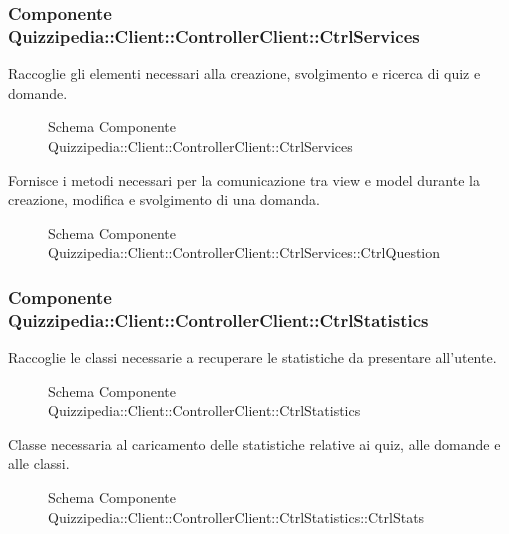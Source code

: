 \subsubsection{Componente Quizzipedia::Client::ControllerClient::CtrlServices}
Raccoglie gli elementi necessari alla creazione, svolgimento e ricerca di quiz e domande.
\begin{figure}[H]
\centering
\noindent{}
\caption{Schema Componente Quizzipedia::Client::ControllerClient::CtrlServices}
\end{figure}
Fornisce i metodi necessari per la comunicazione tra view e model durante la creazione, modifica e svolgimento di una domanda.
\begin{figure}[H]
\centering
\noindent{}
\caption{Schema Componente Quizzipedia::Client::ControllerClient::CtrlServices::CtrlQuestion}
\end{figure}
\subsubsection{Componente Quizzipedia::Client::ControllerClient::CtrlStatistics}
Raccoglie le classi necessarie a recuperare le statistiche da presentare all'utente.
\begin{figure}[H]
\centering
\noindent{}
\caption{Schema Componente Quizzipedia::Client::ControllerClient::CtrlStatistics}
\end{figure}
Classe necessaria al caricamento delle statistiche relative ai quiz, alle domande e alle classi.
\begin{figure}[H]
\centering
\noindent{}
\caption{Schema Componente Quizzipedia::Client::ControllerClient::CtrlStatistics::CtrlStats}
\end{figure}
